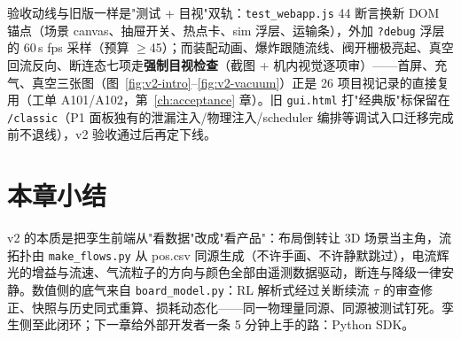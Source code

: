 验收动线与旧版一样是"测试 + 目视"双轨：\texttt{test\_webapp.js} 44 断言换新 DOM 锚点（场景 canvas、抽屉开关、热点卡、sim 浮层、运输条），外加 \texttt{?debug} 浮层的 60\,s fps 采样（预算 $\ge$45）；而装配动画、爆炸跟随流线、阀开栅极亮起、真空回流反向、断连态七项走\textbf{强制目视检查}（截图 + 机内视觉逐项审）——首屏、充气、真空三张图（图~\ref{fig:v2-intro}--\ref{fig:v2-vacuum}）正是 26 项目视记录的直接复用（工单 A101/A102，第~\ref{ch:acceptance} 章）。旧 \texttt{gui.html} 打"经典版"标保留在 \texttt{/classic}（P1 面板独有的泄漏注入/物理注入/scheduler 编排等调试入口迁移完成前不退线），v2 验收通过后再定下线。

\section*{本章小结}
v2 的本质是把孪生前端从"看数据"改成"看产品"：布局倒转让 3D 场景当主角，流拓扑由 \texttt{make\_flows.py} 从 pos.csv 同源生成（不许手画、不许静默跳过），电流辉光的增益与流速、气流粒子的方向与颜色全部由遥测数据驱动，断连与降级一律安静。数值侧的底气来自 \texttt{board\_model.py}：RL 解析式经过关断续流 $\tau$ 的审查修正、快照与历史同式重算、损耗动态化——同一物理量同源、同源被测试钉死。孪生侧至此闭环；下一章给外部开发者一条 5 分钟上手的路：Python SDK。

